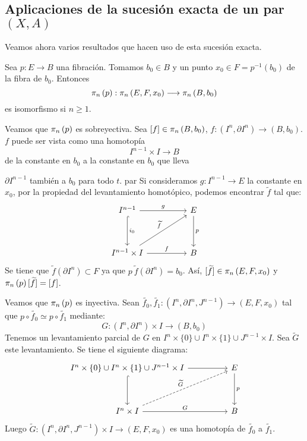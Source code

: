 \subsection*{Aplicaciones de la sucesión exacta de un par $(X,A)$}
Veamos ahora varios resultados que hacen uso de esta sucesión exacta.
\begin{teor}
Sea $p : E \longrightarrow B$ una fibración. Tomamos $b_0 \in B$ y un punto $x_0 \in F = p^{-1}(b_0)$ de la fibra de $b_0$. Entonces
\[
\homot{n}{p} : \homot{n}{E, F, x_0} \longrightarrow \homot{n}{B, b_0}
\]
es isomorfismo si $n \geq 1$.
\end{teor}
\begin{demo}
Veamos que $\pi_{n}\left(p\right)$ es sobreyectiva. Sea $[f] \in \pi_{n}\left(B, b_0\right)$, $f: (I^n, \partial I^n) \longrightarrow (B, b_0)$. $f$ puede ser vista como una homotopía
\[
I^{n-1}  \times I \longrightarrow B
\]
de la constante en $b_0$ a la constante en $b_0$ que lleva \par
{}\par
$\partial I^{n-1}$ también a $b_0$ para todo $t$. par
Si consideramos $g: I^{n-1} \longrightarrow E$ la constante en $x_0$, por la propiedad del levantamiento homotópico, podemos encontrar $\widetilde{f}$ tal que:
\[
\begin{tikzcd}
I^{n-1} \arrow{rr}{g} \arrow[hook]{dd}{i_0} & & E \arrow{dd}{p} \\
\\
I^{n-1} \times I \arrow{rr}{f} \arrow{uurr}{\widetilde{f}} & & B
\end{tikzcd}
\]
Se tiene que $\widetilde{f}(\partial I^n) \subset F$ ya que $p \ \widetilde{f}(\partial I^n) = b_0$. Así, $[\widetilde{f}] \in \pi_{n}\left(E, F, x_0\right)$ y $\pi_{n}\left(p\right)[\widetilde{f}] = [f]$. \par
Veamos que $\pi_{n}\left(p\right)$ es inyectiva. Sean $\widetilde{f_0}, \widetilde{f_1} : (I^n, \partial I^n, J^{n-1}) \longrightarrow (E, F, x_0)$ tal que $p \circ \widetilde{f_0} \simeq p \circ \widetilde{f_1}$ mediante:
\[
G: (I^n, \partial I^n) \times I \longrightarrow (B, b_0)
\]
Tenemos un levantamiento parcial de $G$ en $I^n \times \{0\} \cup I^n \times \{1\} \cup J^{n-1} \times I$. Sea $\widetilde{G}$ este levantamiento. Se tiene el siguiente diagrama:
\[
\begin{tikzcd}
I^n \times \{0\} \cup I^n \times \{1\} \cup J^{n-1} \times I \arrow[hook]{dd} \arrow{rr} & & E \arrow{dd}{p} \\
\\
I^n \times I \arrow{rr}{G} \arrow[dashed]{uurr}{\widetilde{G}}& & B
\end{tikzcd}
\]
Luego $\widetilde{G} : (I^n, \partial I^n, J^{n-1}) \times I \longrightarrow (E, F, x_0)$ es una homotopía de $\widetilde{f_0}$ a $\widetilde{f_1}$.
\end{demo}
